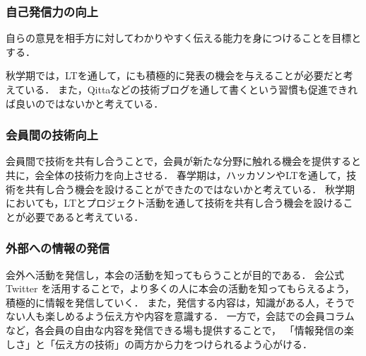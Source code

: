 \subsubsection*{自己発信力の向上}
自らの意見を相手方に対してわかりやすく伝える能力を身につけることを目標とする．

秋学期では，LTを通して，\firstGrade{}にも積極的に発表の機会を与えることが必要だと考えている．
また，Qittaなどの技術ブログを通して書くという習慣も促進できれば良いのではないかと考えている．

\subsubsection*{会員間の技術向上}
会員間で技術を共有し合うことで，会員が新たな分野に触れる機会を提供すると共に，会全体の技術力を向上させる．
春学期は，ハッカソンやLTを通して，技術を共有し合う機会を設けることができたのではないかと考えている．
秋学期においても，LTとプロジェクト活動を通して技術を共有し合う機会を設けることが必要であると考えている．

\subsubsection*{外部への情報の発信}
会外へ活動を発信し，本会の活動を知ってもらうことが目的である．
会公式 Twitter を活用することで，より多くの人に本会の活動を知ってもらえるよう，積極的に情報を発信していく．
また，発信する内容は，知識がある人，そうでない人も楽しめるよう伝え方や内容を意識する．
一方で，会誌での会員コラムなど，各会員の自由な内容を発信できる場も提供することで，
「情報発信の楽しさ」と「伝え方の技術」の両方から力をつけられるよう心がける．
